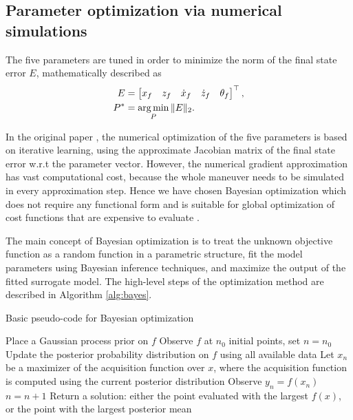\subsection{Parameter optimization via numerical simulations}
The five parameters are tuned in order to minimize the norm of the final state error $E$, mathematically described as
\begin{subequations}\label{eq:optim}
\begin{align}
E &= \begin{bmatrix}
x_f & z_f & \dot{x}_f & \dot{z}_f & \theta_f
\end{bmatrix}^\top,\\
P^* &= \operatorname*{arg\,min}_P \|E\|_2.
\end{align} 
\end{subequations}

In the original paper \cite{LSICRA2010}, the numerical optimization of the five parameters is based on iterative learning, using the approximate Jacobian matrix of the final state error w.r.t the parameter vector. However, the numerical gradient approximation has vast computational cost, because the whole maneuver needs to be simulated in every approximation step. Hence we have chosen Bayesian optimization which does not require any functional form and is suitable for global optimization of cost functions that are expensive to evaluate \cite{frazier2018tutorial, bayesopt2, brochu2010tutorial}.

The main concept of Bayesian optimization is to treat the unknown objective function as a random function in a parametric structure, fit the model parameters using Bayesian inference techniques, and maximize the output of the fitted surrogate model. The high-level steps of the optimization method are described in Algorithm \ref{alg:bayes}.
\begin{algorithm}
\caption{Basic pseudo-code for Bayesian optimization \cite{frazier2018tutorial}}
\label{alg:bayes}
\begin{algorithmic}[1]
	\State Place a Gaussian process prior on $f$
    \State Observe $f$ at $n_0$ initial points, set $n=n_0$
    \State Update the posterior probability distribution on $f$ using all available data
    \State Let $x_n$ be a maximizer of the acquisition function over $x$, where the acquisition function is computed using the current posterior distribution
    \State Observe $y_n = f(x_n)$
    \State $n=n+1$
	\EndWhile
	\State Return a solution: either the point evaluated with the largest $f(x)$, or the point with the largest posterior mean
\end{algorithmic}
\end{algorithm}

